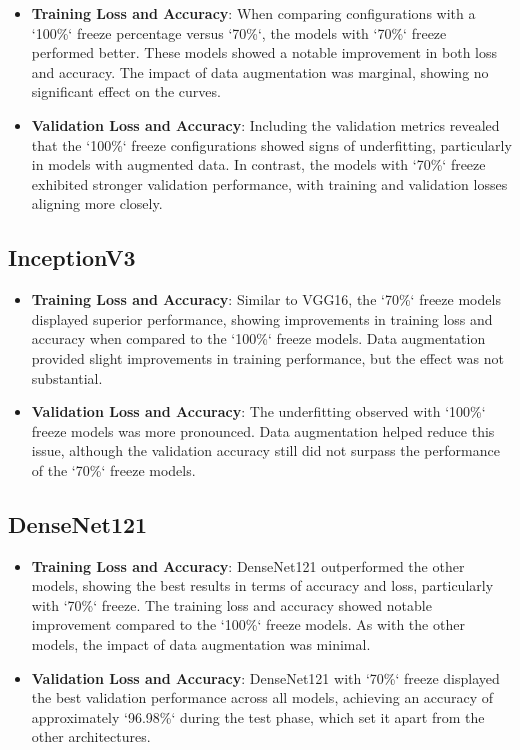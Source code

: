 \begin{itemize}
    \item \textbf{Training Loss and Accuracy}:
    When comparing configurations with a `100\%` freeze percentage versus `70\%`, the models with `70\%` freeze performed better. These models showed a notable improvement in both loss and accuracy. The impact of data augmentation was marginal, showing no significant effect on the curves.

    \item \textbf{Validation Loss and Accuracy}:
    Including the validation metrics revealed that the `100\%` freeze configurations showed signs of underfitting, particularly in models with augmented data. In contrast, the models with `70\%` freeze exhibited stronger validation performance, with training and validation losses aligning more closely.
\end{itemize}

\subsection{InceptionV3}

\begin{itemize}
    \item \textbf{Training Loss and Accuracy}:
    Similar to VGG16, the `70\%` freeze models displayed superior performance, showing improvements in training loss and accuracy when compared to the `100\%` freeze models. Data augmentation provided slight improvements in training performance, but the effect was not substantial.

    \item \textbf{Validation Loss and Accuracy}:
    The underfitting observed with `100\%` freeze models was more pronounced. Data augmentation helped reduce this issue, although the validation accuracy still did not surpass the performance of the `70\%` freeze models.
\end{itemize}

\subsection{DenseNet121}

\begin{itemize}
    \item \textbf{Training Loss and Accuracy}:
    DenseNet121 outperformed the other models, showing the best results in terms of accuracy and loss, particularly with `70\%` freeze. The training loss and accuracy showed notable improvement compared to the `100\%` freeze models. As with the other models, the impact of data augmentation was minimal.

    \item \textbf{Validation Loss and Accuracy}:
    DenseNet121 with `70\%` freeze displayed the best validation performance across all models, achieving an accuracy of approximately `96.98\%` during the test phase, which set it apart from the other architectures.
\end{itemize}

